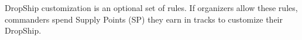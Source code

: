 DropShip customization is an optional set of rules.
If organizers allow these rules, commanders spend Supply Points (SP) they earn in tracks to customize their DropShip.
